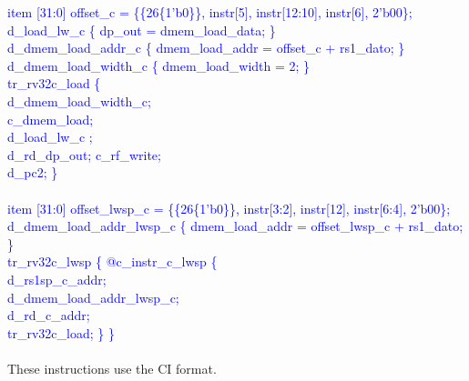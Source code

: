 \textcolor{blue}{
\indent item [31:0] offset\_c = \{\{26\{1'b0\}\}, instr[5], instr[12:10], instr[6], 2'b00\};\\%
\indent d\_load\_lw\_c \{ dp\_out = dmem\_load\_data; \}\\%
\indent d\_dmem\_load\_addr\_c \{ dmem\_load\_addr = offset\_c + rs1\_dato; \}\\%
\indent d\_dmem\_load\_width\_c \{ dmem\_load\_width = 2; \}\\%
\indent tr\_rv32c\_load \{\\%
\indent \hspace{\parindent}d\_dmem\_load\_width\_c; \\%
\indent \hspace{\parindent}c\_dmem\_load; \\%
\indent \hspace{\parindent}d\_load\_lw\_c ; \\%
\indent \hspace{\parindent}d\_rd\_dp\_out; c\_rf\_write; \\%
\indent \hspace{\parindent}d\_pc2; \} \\%
	\\
\indent item [31:0] offset\_lwsp\_c = \{\{26\{1'b0\}\}, instr[3:2], instr[12], instr[6:4], 2'b00\};\\%
\indent d\_dmem\_load\_addr\_lwsp\_c \{ dmem\_load\_addr = offset\_lwsp\_c + rs1\_dato; \}\\%
\indent tr\_rv32c\_lwsp \{ @c\_instr\_c\_lwsp \{\\%
\indent \hspace{\parindent} d\_rs1sp\_c\_addr; \\%
\indent \hspace{\parindent} d\_dmem\_load\_addr\_lwsp\_c; \\%
\indent \hspace{\parindent} d\_rd\_c\_addr; \\%
\indent \hspace{\parindent} tr\_rv32c\_load; \} \} \\%
\\
}
These instructions use the CI format.

